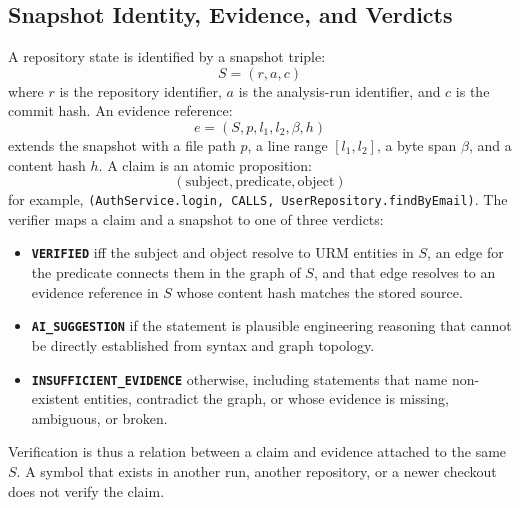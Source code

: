 \documentclass[runningheads]{llncs}
\begin{document}
\subsection{Snapshot Identity, Evidence, and Verdicts}
A repository state is identified by a snapshot triple:
\begin{equation}
    S = (r, a, c)
\end{equation}
where $r$ is the repository identifier, $a$ is the analysis-run identifier, and $c$ is the commit hash. An evidence reference:
\begin{equation}
    e = (S, p, l_1, l_2, \beta, h)
\end{equation}
extends the snapshot with a file path $p$, a line range $[l_1, l_2]$, a byte span $\beta$, and a content hash $h$. A claim is an atomic proposition:
\begin{equation}
    (\text{subject}, \text{predicate}, \text{object})
\end{equation}
for example, \texttt{(AuthService.login, CALLS, UserRepository.findByEmail)}. The verifier maps a claim and a snapshot to one of three verdicts:
\begin{itemize}
    \item \textbf{\texttt{VERIFIED}} iff the subject and object resolve to URM entities in $S$, an edge for the predicate connects them in the graph of $S$, and that edge resolves to an evidence reference in $S$ whose content hash matches the stored source.
    \item \textbf{\texttt{AI\_SUGGESTION}} if the statement is plausible engineering reasoning that cannot be directly established from syntax and graph topology.
    \item \textbf{\texttt{INSUFFICIENT\_EVIDENCE}} otherwise, including statements that name non-existent entities, contradict the graph, or whose evidence is missing, ambiguous, or broken.
\end{itemize}

Verification is thus a relation between a claim and evidence attached to the same $S$. A symbol that exists in another run, another repository, or a newer checkout does not verify the claim.
\end{document}
